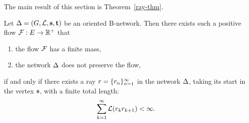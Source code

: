 \documentclass[12pt]{amsart}
\begin{document}
    The main result of this section is Theorem~\ref{ray-thm}.
    \begin{theorem}
      \label{ray-thm}
      Let $\Delta = (G, \mathcal{L}, \mathbf{s}, \mathbf{t})$ be an oriented B-network.
      Then there exists such a positive flow $\mathcal{F}: E \to \mathbb{R}^{+}$ that
      \begin{enumerate}[label=(\alph*)]
        \item the flow $\mathcal{F}$ has a finite mass,
        \item the network $\Delta$ does not preserve the flow,
      \end{enumerate}
        if and only if there exists a ray $r = \{{r}_n\}_{n=1}^\infty$ in the network $\Delta$, taking its start in the vertex $\mathbf{s}$,
          with a finite total length:
        \[
          \sum_{k=1}^\infty \mathcal{L}(r_k r_{k+1}) < \infty.
        \]
    \end{theorem}
\end{document}
